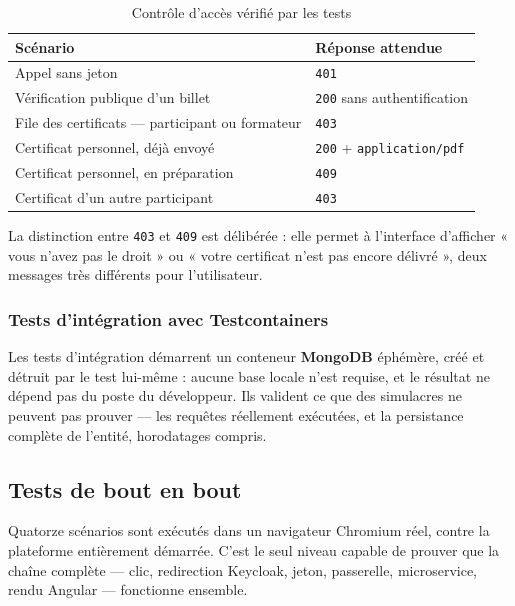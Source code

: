 \begin{table}[H]\centering\renewcommand{\arraystretch}{1.25}
\begin{tabular}{|p{8.5cm}|p{4cm}|}\hline
\rowcolor{gray!15}\textbf{Scénario} & \textbf{Réponse attendue} \\ \hline
Appel sans jeton & \texttt{401} \\ \hline
Vérification publique d'un billet & \texttt{200} sans authentification \\ \hline
File des certificats — participant ou formateur & \texttt{403} \\ \hline
Certificat personnel, déjà envoyé & \texttt{200} + \texttt{application/pdf} \\ \hline
Certificat personnel, en préparation & \texttt{409} \\ \hline
Certificat d'un autre participant & \texttt{403} \\ \hline
\end{tabular}
\caption{Contrôle d'accès vérifié par les tests}\label{tab:securite}
\end{table}

La distinction entre \texttt{403} et \texttt{409} est délibérée : elle permet à l'interface
d'afficher « vous n'avez pas le droit » ou « votre certificat n'est pas encore délivré »,
deux messages très différents pour l'utilisateur.

\subsubsection{Tests d'intégration avec Testcontainers}
Les tests d'intégration démarrent un conteneur \textbf{MongoDB} éphémère, créé et détruit
par le test lui-même : aucune base locale n'est requise, et le résultat ne dépend pas du
poste du développeur. Ils valident ce que des simulacres ne peuvent pas prouver — les
requêtes réellement exécutées, et la persistance complète de l'entité, horodatages compris.

\subsection{Tests de bout en bout}

Quatorze scénarios sont exécutés dans un navigateur Chromium réel, contre la plateforme
entièrement démarrée. C'est le seul niveau capable de prouver que la chaîne complète — clic,
redirection Keycloak, jeton, passerelle, microservice, rendu Angular — fonctionne ensemble.

